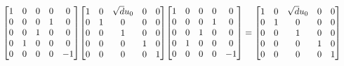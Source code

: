 \documentclass[11pt]{article}
\theoremstyle{definition}
\begin{document}
\[
\scaletoalign{\textwidth}{{\left[\begin{matrix}1 & 0 & 0 & 0 & 0\\0 & 0 & 0 & 1 & 0\\0 & 0 & 1 & 0 & 0\\0 & 1 & 0 & 0 & 0\\0 & 0 & 0 & 0 & -1\end{matrix}\right]} {\left[\begin{matrix}1 & 0 & \sqrt{d} u_{0} & 0 & 0\\0 & 1 & 0 & 0 & 0\\0 & 0 & 1 & 0 & 0\\0 & 0 & 0 & 1 & 0\\0 & 0 & 0 & 0 & 1\end{matrix}\right]} {\left[\begin{matrix}1 & 0 & 0 & 0 & 0\\0 & 0 & 0 & 1 & 0\\0 & 0 & 1 & 0 & 0\\0 & 1 & 0 & 0 & 0\\0 & 0 & 0 & 0 & -1\end{matrix}\right]} = {\left[\begin{matrix}1 & 0 & \sqrt{d} u_{0} & 0 & 0\\0 & 1 & 0 & 0 & 0\\0 & 0 & 1 & 0 & 0\\0 & 0 & 0 & 1 & 0\\0 & 0 & 0 & 0 & 1\end{matrix}\right]}}
\]
\end{document}
